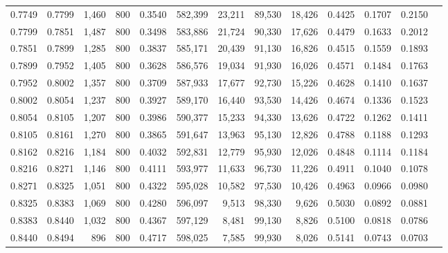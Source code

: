 \begin{tabular}{rrrrrrrrrrrrr}
0.7749 & 0.7799 &  1,460 &   800 &                                     0.3540 & 582,399 &  23,211 &  89,530 &  18,426 & 0.4425 & 0.1707 & 0.2150 \\
0.7799 & 0.7851 &  1,487 &   800 &                                     0.3498 & 583,886 &  21,724 &  90,330 &  17,626 & 0.4479 & 0.1633 & 0.2012 \\
0.7851 & 0.7899 &  1,285 &   800 &                                     0.3837 & 585,171 &  20,439 &  91,130 &  16,826 & 0.4515 & 0.1559 & 0.1893 \\
0.7899 & 0.7952 &  1,405 &   800 &                                     0.3628 & 586,576 &  19,034 &  91,930 &  16,026 & 0.4571 & 0.1484 & 0.1763 \\
0.7952 & 0.8002 &  1,357 &   800 &                                     0.3709 & 587,933 &  17,677 &  92,730 &  15,226 & 0.4628 & 0.1410 & 0.1637 \\
0.8002 & 0.8054 &  1,237 &   800 &                                     0.3927 & 589,170 &  16,440 &  93,530 &  14,426 & 0.4674 & 0.1336 & 0.1523 \\
0.8054 & 0.8105 &  1,207 &   800 &                                     0.3986 & 590,377 &  15,233 &  94,330 &  13,626 & 0.4722 & 0.1262 & 0.1411 \\
0.8105 & 0.8161 &  1,270 &   800 &                                     0.3865 & 591,647 &  13,963 &  95,130 &  12,826 & 0.4788 & 0.1188 & 0.1293 \\
0.8162 & 0.8216 &  1,184 &   800 &                                     0.4032 & 592,831 &  12,779 &  95,930 &  12,026 & 0.4848 & 0.1114 & 0.1184 \\
0.8216 & 0.8271 &  1,146 &   800 &                                     0.4111 & 593,977 &  11,633 &  96,730 &  11,226 & 0.4911 & 0.1040 & 0.1078 \\
0.8271 & 0.8325 &  1,051 &   800 &                                     0.4322 & 595,028 &  10,582 &  97,530 &  10,426 & 0.4963 & 0.0966 & 0.0980 \\
0.8325 & 0.8383 &  1,069 &   800 &                                     0.4280 & 596,097 &   9,513 &  98,330 &   9,626 & 0.5030 & 0.0892 & 0.0881 \\
0.8383 & 0.8440 &  1,032 &   800 &                                     0.4367 & 597,129 &   8,481 &  99,130 &   8,826 & 0.5100 & 0.0818 & 0.0786 \\
0.8440 & 0.8494 &    896 &   800 &                                     0.4717 & 598,025 &   7,585 &  99,930 &   8,026 & 0.5141 & 0.0743 & 0.0703 \\

\end{tabular}

